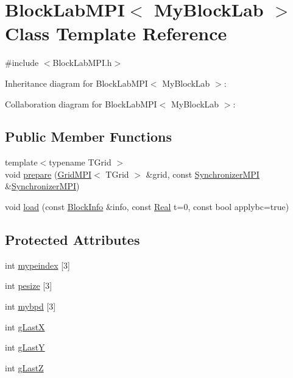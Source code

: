 \hypertarget{class_block_lab_m_p_i}{}\section{Block\+Lab\+M\+P\+I$<$ My\+Block\+Lab $>$ Class Template Reference}
\label{class_block_lab_m_p_i}


{\ttfamily \#include $<$Block\+Lab\+M\+P\+I.\+h$>$}



Inheritance diagram for Block\+Lab\+M\+P\+I$<$ My\+Block\+Lab $>$\+:


Collaboration diagram for Block\+Lab\+M\+P\+I$<$ My\+Block\+Lab $>$\+:
\subsection*{Public Member Functions}
\begin{DoxyCompactItemize}
\item 
{\footnotesize template$<$typename T\+Grid $>$ }\\void \hyperlink{class_block_lab_m_p_i_a49e9b846d16c1c3f177b6ff067bc791c}{prepare} (\hyperlink{class_grid_m_p_i}{Grid\+M\+P\+I}$<$ T\+Grid $>$ \&grid, const \hyperlink{class_synchronizer_m_p_i}{Synchronizer\+M\+P\+I} \&\hyperlink{class_synchronizer_m_p_i}{Synchronizer\+M\+P\+I})
\item 
void \hyperlink{class_block_lab_m_p_i_a9695a460545974a0aa473039c3876765}{load} (const \hyperlink{struct_block_info}{Block\+Info} \&info, const \hyperlink{_h_d_f5_dumper_8h_a445a5f0e2a34c9d97d69a3c2d1957907}{Real} t=0, const bool applybc=true)
\end{DoxyCompactItemize}
\subsection*{Protected Attributes}
\begin{DoxyCompactItemize}
\item 
int \hyperlink{class_block_lab_m_p_i_a346371e08c48393a09a60188aa210828}{mypeindex} \mbox{[}3\mbox{]}
\item 
int \hyperlink{class_block_lab_m_p_i_a3c58102452df2ae20110af79d504693e}{pesize} \mbox{[}3\mbox{]}
\item 
int \hyperlink{class_block_lab_m_p_i_a11a592341f9c28f07809f0d950512fe5}{mybpd} \mbox{[}3\mbox{]}
\item 
int \hyperlink{class_block_lab_m_p_i_a41646b94f197315e4c39c5155ee939eb}{g\+Last\+X}
\item 
int \hyperlink{class_block_lab_m_p_i_afc336a0d08b78a9196eb24701816d6c8}{g\+Last\+Y}
\item 
int \hyperlink{class_block_lab_m_p_i_a8b9247a3ec2caad18896f597b98b7103}{g\+Last\+Z}
\end{DoxyCompactItemize}


